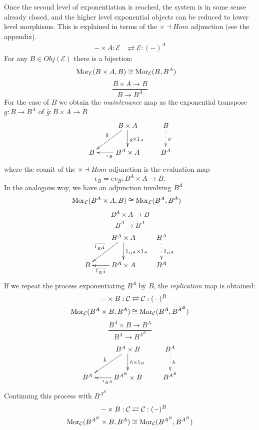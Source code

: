 Once the second level of exponentiation is reached, the system is in some sense already closed, and the higher level exponential objects can be reduced to lower level morphisms. This is explained in terms of the $\times \dashv Hom$ adjunction (see the appendix). 
\begin{align*}
- \times A: \mathcal{E} & \rightleftarrows \mathcal{E}: (-)^A
\end{align*}
For any $B \in Obj(\mathcal{E})$ there is a bijection:
\begin{align*}
\mathop{\rm Mor}\nolimits_{\mathcal{E}}(B \times A, B) & \cong  \mathop{\rm Mor}\nolimits_{\mathcal{E}}(B, B^A)
\end{align*}
$$
	\frac{B \times A \longrightarrow B}{B \longrightarrow B^A}
$$
For the case of $B$ we obtain the \emph{maintenance} map as the exponential transpose $g \colon B \rightarrow B^A$ of $\bar{g}:B \times A \rightarrow B$
$$
	\xymatrix{
	& B \times A \ar[d]^{g \times 1_A} \ar[dl]_{\bar{g}} & B \ar@{.>}[d]^{g}\\
	B & B^A \times A \ar[l]^{\epsilon_B} & B^A}
$$
where the counit of the $\times \dashv Hom$ adjunction is the evaluation map
$$
	\epsilon_B = ev_B \colon B^A \times A \longrightarrow B.
$$
In the analogous way, we have an adjunction involving $B^A$
\begin{align*}
\mathop{\rm Mor}\nolimits_{\mathcal{E}}(B^A \times A, B) & \cong  \mathop{\rm Mor}\nolimits_{\mathcal{E}}(B^A, B^{A})
\end{align*}
$$
	\frac{B^A \times A \longrightarrow B}{B^A \longrightarrow B^{A}}
$$
$$
	\xymatrix{
	& B^A \times A \ar[d]^{1_{B^A} \times 1_A} \ar[dl]_{\overline{1_{B^A}}} & 	B^A \ar@{.>}[d]^{1_{B^A}}\\
	B & B^A \times A \ar[l]^-{\overline{1_{B^A}}} & B^A}
$$
If we repeat the process exponentiating $B^A$ by $B$, the \emph{replication} map is obtained:	
\begin{align*}
- \times B: \mathcal{C} & \rightleftarrows \mathcal{C}: (-)^B\\
\mathop{\rm Mor}\nolimits_{\mathcal{C}}(B^A \times B, B^A) & \cong  \mathop{\rm Mor}\nolimits_{\mathcal{C}}(B^A, B^{A^B})
\end{align*}
$$
			\frac{B^A \times B \longrightarrow B^A}{B^A \longrightarrow B^{A^B}}
$$
$$ 
	\xymatrix{
	& B^A \times B \ar[d]^-{h \times 1_B} \ar[dl]_{\bar{h}} & B^A \ar@{.>}[d]^-{h}\\
	B^A & B^{A^B} \times B \ar[l]^{\epsilon_{B^A}} & B^{A^B}}
$$
Continuing this process with $B^{A^B}$
\begin{align*}
- \times B: \mathcal{C} & \rightleftarrows \mathcal{C}: (-)^B\\
\mathop{\rm Mor}\nolimits_{\mathcal{C}}(B^{A^B} \times B, B^A) & \cong  \mathop{\rm Mor}\nolimits_{\mathcal{C}}(B^{A^B}, B^{A^B})
\end{align*}
